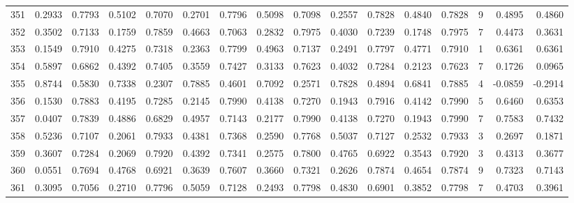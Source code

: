 \begin{tabular}{lrrrrrrrrrrrrrrr}
351 &      0.2933 &  0.7793 &  0.5102 &  0.7070 &  0.2701 &  0.7796 &  0.5098 &  0.7098 &  0.2557 &  0.7828 &   0.4840 &     0.7828 &      9 &                    0.4895 &                     0.4860 \\
352 &      0.3502 &  0.7133 &  0.1759 &  0.7859 &  0.4663 &  0.7063 &  0.2832 &  0.7975 &  0.4030 &  0.7239 &   0.1748 &     0.7975 &      7 &                    0.4473 &                     0.3631 \\
353 &      0.1549 &  0.7910 &  0.4275 &  0.7318 &  0.2363 &  0.7799 &  0.4963 &  0.7137 &  0.2491 &  0.7797 &   0.4771 &     0.7910 &      1 &                    0.6361 &                     0.6361 \\
354 &      0.5897 &  0.6862 &  0.4392 &  0.7405 &  0.3559 &  0.7427 &  0.3133 &  0.7623 &  0.4032 &  0.7284 &   0.2123 &     0.7623 &      7 &                    0.1726 &                     0.0965 \\
355 &      0.8744 &  0.5830 &  0.7338 &  0.2307 &  0.7885 &  0.4601 &  0.7092 &  0.2571 &  0.7828 &  0.4894 &   0.6841 &     0.7885 &      4 &                   -0.0859 &                    -0.2914 \\
356 &      0.1530 &  0.7883 &  0.4195 &  0.7285 &  0.2145 &  0.7990 &  0.4138 &  0.7270 &  0.1943 &  0.7916 &   0.4142 &     0.7990 &      5 &                    0.6460 &                     0.6353 \\
357 &      0.0407 &  0.7839 &  0.4886 &  0.6829 &  0.4957 &  0.7143 &  0.2177 &  0.7990 &  0.4138 &  0.7270 &   0.1943 &     0.7990 &      7 &                    0.7583 &                     0.7432 \\
358 &      0.5236 &  0.7107 &  0.2061 &  0.7933 &  0.4381 &  0.7368 &  0.2590 &  0.7768 &  0.5037 &  0.7127 &   0.2532 &     0.7933 &      3 &                    0.2697 &                     0.1871 \\
359 &      0.3607 &  0.7284 &  0.2069 &  0.7920 &  0.4392 &  0.7341 &  0.2575 &  0.7800 &  0.4765 &  0.6922 &   0.3543 &     0.7920 &      3 &                    0.4313 &                     0.3677 \\
360 &      0.0551 &  0.7694 &  0.4768 &  0.6921 &  0.3639 &  0.7607 &  0.3660 &  0.7321 &  0.2626 &  0.7874 &   0.4654 &     0.7874 &      9 &                    0.7323 &                     0.7143 \\
361 &      0.3095 &  0.7056 &  0.2710 &  0.7796 &  0.5059 &  0.7128 &  0.2493 &  0.7798 &  0.4830 &  0.6901 &   0.3852 &     0.7798 &      7 &                    0.4703 &                     0.3961 \\

\end{tabular}

